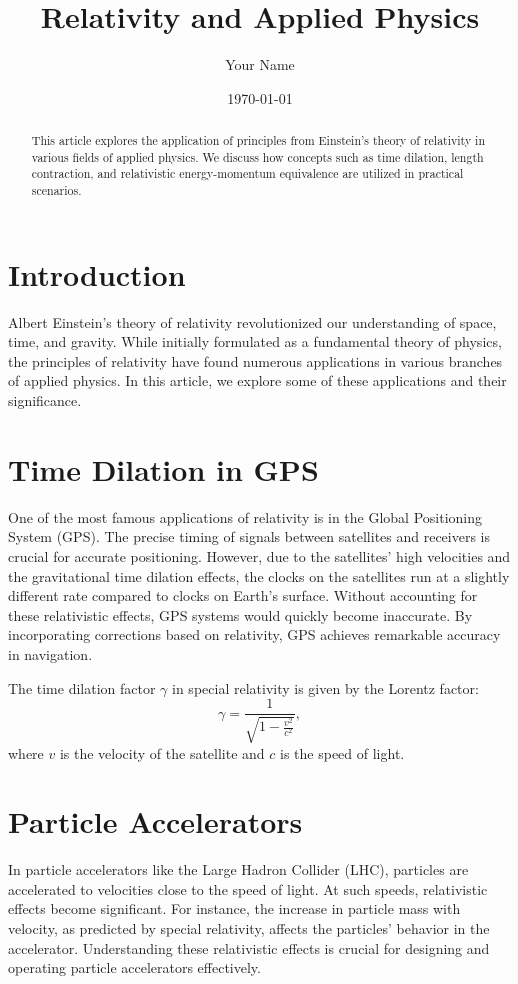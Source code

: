 \documentclass[11pt]{article}
\title{Relativity and Applied Physics}
\author{Your Name}
\date{\today}
\begin{document}
\maketitle

\begin{abstract}
This article explores the application of principles from Einstein's theory of relativity in various fields of applied physics. We discuss how concepts such as time dilation, length contraction, and relativistic energy-momentum equivalence are utilized in practical scenarios.
\end{abstract}

\section{Introduction}
Albert Einstein's theory of relativity revolutionized our understanding of space, time, and gravity. While initially formulated as a fundamental theory of physics, the principles of relativity have found numerous applications in various branches of applied physics. In this article, we explore some of these applications and their significance.

\section{Time Dilation in GPS}
One of the most famous applications of relativity is in the Global Positioning System (GPS). The precise timing of signals between satellites and receivers is crucial for accurate positioning. However, due to the satellites' high velocities and the gravitational time dilation effects, the clocks on the satellites run at a slightly different rate compared to clocks on Earth's surface. Without accounting for these relativistic effects, GPS systems would quickly become inaccurate. By incorporating corrections based on relativity, GPS achieves remarkable accuracy in navigation.

The time dilation factor $\gamma$ in special relativity is given by the Lorentz factor:
\begin{equation}
    \gamma = \frac{1}{\sqrt{1 - \frac{v^2}{c^2}}},
\end{equation}
where $v$ is the velocity of the satellite and $c$ is the speed of light.

\section{Particle Accelerators}
In particle accelerators like the Large Hadron Collider (LHC), particles are accelerated to velocities close to the speed of light. At such speeds, relativistic effects become significant. For instance, the increase in particle mass with velocity, as predicted by special relativity, affects the particles' behavior in the accelerator. Understanding these relativistic effects is crucial for designing and operating particle accelerators effectively.
\end{document}
